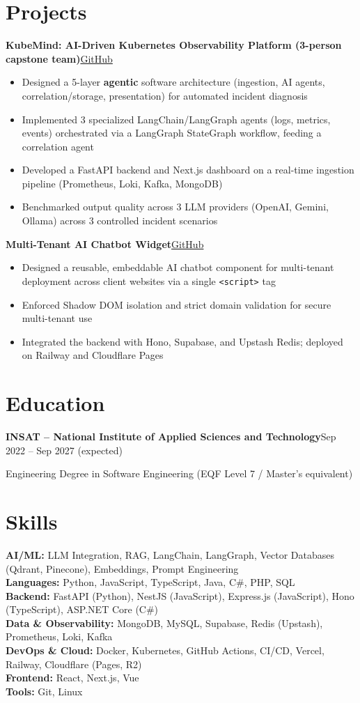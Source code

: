 \documentclass[10pt,a4paper]{article}
\newcommand{\entry}[2]{\vspace{1pt}\noindent\textbf{#1}\hfill{\color{muted}#2}\par}
\newcommand{\gh}[1]{\href{https://github.com/Hsan003/#1}{GitHub}}
\begin{document}
\section{Projects}
\entry{KubeMind: AI-Driven Kubernetes Observability Platform (3-person capstone team)}{\gh{kubemind}}
\begin{itemize}
  \item Designed a 5-layer \textbf{agentic} software architecture (ingestion, AI agents, correlation/storage, presentation) for automated incident diagnosis
  \item Implemented 3 specialized LangChain/LangGraph agents (logs, metrics, events) orchestrated via a LangGraph StateGraph workflow, feeding a correlation agent
  \item Developed a FastAPI backend and Next.js dashboard on a real-time ingestion pipeline (Prometheus, Loki, Kafka, MongoDB)
  \item Benchmarked output quality across 3 LLM providers (OpenAI, Gemini, Ollama) across 3 controlled incident scenarios
\end{itemize}
\entry{Multi-Tenant AI Chatbot Widget}{\gh{AI-Assistant-Backend}}
\begin{itemize}
  \item Designed a reusable, embeddable AI chatbot component for multi-tenant deployment across client websites via a single \texttt{<script>} tag
  \item Enforced Shadow DOM isolation and strict domain validation for secure multi-tenant use
  \item Integrated the backend with Hono, Supabase, and Upstash Redis; deployed on Railway and Cloudflare Pages
\end{itemize}

\section{Education}
\entry{INSAT -- National Institute of Applied Sciences and Technology}{Sep 2022 -- Sep 2027 (expected)}
Engineering Degree in Software Engineering (EQF Level 7 / Master's equivalent)

\section{Skills}
\textbf{AI/ML:} LLM Integration, RAG, LangChain, LangGraph, Vector Databases (Qdrant, Pinecone), Embeddings, Prompt Engineering\\
\textbf{Languages:} Python, JavaScript, TypeScript, Java, C\#, PHP, SQL\\
\textbf{Backend:} FastAPI (Python), NestJS (JavaScript), Express.js (JavaScript), Hono (TypeScript), ASP.NET Core (C\#)\\
\textbf{Data \& Observability:} MongoDB, MySQL, Supabase, Redis (Upstash), Prometheus, Loki, Kafka\\
\textbf{DevOps \& Cloud:} Docker, Kubernetes, GitHub Actions, CI/CD, Vercel, Railway, Cloudflare (Pages, R2)\\
\textbf{Frontend:} React, Next.js, Vue\\
\textbf{Tools:} Git, Linux
\end{document}
